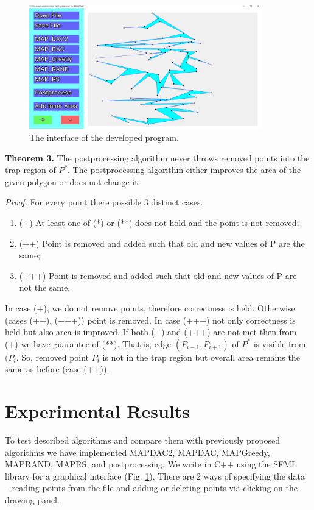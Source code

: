 \documentclass[conference]{IEEEtran}
\begin{document}
			\begin{figure}[htbp]
				\centerline{\includegraphics[width=0.9\textwidth]{fig4.png}}
				\caption{The interface of the developed program.}
				\label{fig4}
			\end{figure}

			\textbf{Theorem 3.}
			The postprocessing algorithm never throws removed points into the trap region of $P^{*}$.
			The postprocessing algorithm either improves the area of the given polygon or does not change it.
			
			\textit{Proof.}
			For every point there possible 3 distinct cases.
			\begin{enumerate}
				\item (+) At least one of (*) or (**) does not hold and the point is not removed;
				\item (++) Point is removed and added such that old and new values of P are the same;
				\item (+++) Point is removed and added such that old and new values of P are not the same.
			\end{enumerate}
			
			In case (+), we do not remove points, therefore correctness is held.
			Otherwise (cases (++), (+++)) point is removed.
			In case (+++) not only correctness is held but also area is improved.
			If both (+) and (+++) are not met then from (+) we have guarantee of (**).
			That is, edge $(P_{i-1}, P_{i+1})$ of $P^{*}$ is visible from $(P_{i}$.
			So, removed point $P_{i}$ is not in the trap region but overall area remains the same as before (case (++)).
			
	\section{Experimental Results}
	\label{S4}
		To test described algorithms and compare them with previously proposed algorithms we have implemented MAP{\textunderscore}DAC2, MAP{\textunderscore}DAC, MAP{\textunderscore}Greedy, MAP{\textunderscore}RAND, MAP{\textunderscore}RS, and postprocessing.
		We write in C++ using the SFML library for a graphical interface (Fig. \ref{fig4}).
		There are 2 ways of specifying the data – reading points from the file and adding or deleting points via clicking on the drawing panel.
		
\end{document}
